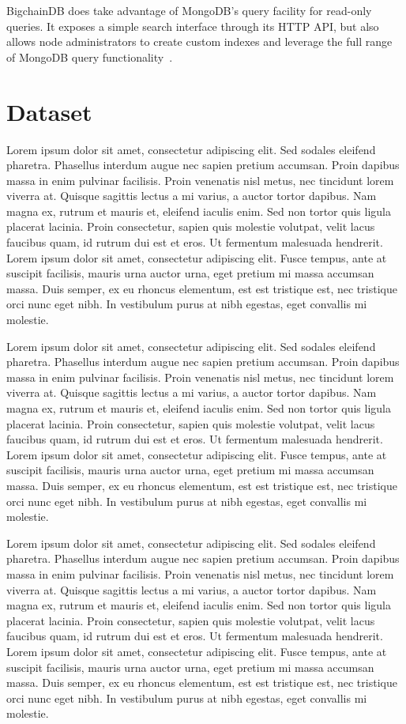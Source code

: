 BigchainDB does take advantage of MongoDB's query facility for
read-only queries. It exposes a simple search interface through its HTTP
API, but also allows node administrators to create custom indexes and
leverage the full range of MongoDB query
functionality~\cite{bdb18d}.

\section{Dataset}
Lorem ipsum dolor sit amet, consectetur adipiscing elit. Sed sodales
eleifend pharetra. Phasellus interdum augue nec sapien pretium accumsan.
Proin dapibus massa in enim pulvinar facilisis. Proin venenatis nisl metus,
nec tincidunt lorem viverra at. Quisque sagittis lectus a mi varius, a
auctor tortor dapibus. Nam magna ex, rutrum et mauris et, eleifend iaculis
enim. Sed non tortor quis ligula placerat lacinia. Proin consectetur, sapien
quis molestie volutpat, velit lacus faucibus quam, id rutrum dui est et
eros. Ut fermentum malesuada hendrerit. Lorem ipsum dolor sit amet,
consectetur adipiscing elit. Fusce tempus, ante at suscipit facilisis,
mauris urna auctor urna, eget pretium mi massa accumsan massa. Duis semper,
ex eu rhoncus elementum, est est tristique est, nec tristique orci nunc eget
nibh. In vestibulum purus at nibh egestas, eget convallis mi molestie.

Lorem ipsum dolor sit amet, consectetur adipiscing elit. Sed sodales
eleifend pharetra. Phasellus interdum augue nec sapien pretium accumsan.
Proin dapibus massa in enim pulvinar facilisis. Proin venenatis nisl metus,
nec tincidunt lorem viverra at. Quisque sagittis lectus a mi varius, a
auctor tortor dapibus. Nam magna ex, rutrum et mauris et, eleifend iaculis
enim. Sed non tortor quis ligula placerat lacinia. Proin consectetur, sapien
quis molestie volutpat, velit lacus faucibus quam, id rutrum dui est et
eros. Ut fermentum malesuada hendrerit. Lorem ipsum dolor sit amet,
consectetur adipiscing elit. Fusce tempus, ante at suscipit facilisis,
mauris urna auctor urna, eget pretium mi massa accumsan massa. Duis semper,
ex eu rhoncus elementum, est est tristique est, nec tristique orci nunc eget
nibh. In vestibulum purus at nibh egestas, eget convallis mi molestie.

Lorem ipsum dolor sit amet, consectetur adipiscing elit. Sed sodales
eleifend pharetra. Phasellus interdum augue nec sapien pretium accumsan.
Proin dapibus massa in enim pulvinar facilisis. Proin venenatis nisl metus,
nec tincidunt lorem viverra at. Quisque sagittis lectus a mi varius, a
auctor tortor dapibus. Nam magna ex, rutrum et mauris et, eleifend iaculis
enim. Sed non tortor quis ligula placerat lacinia. Proin consectetur, sapien
quis molestie volutpat, velit lacus faucibus quam, id rutrum dui est et
eros. Ut fermentum malesuada hendrerit. Lorem ipsum dolor sit amet,
consectetur adipiscing elit. Fusce tempus, ante at suscipit facilisis,
mauris urna auctor urna, eget pretium mi massa accumsan massa. Duis semper,
ex eu rhoncus elementum, est est tristique est, nec tristique orci nunc eget
nibh. In vestibulum purus at nibh egestas, eget convallis mi molestie.

